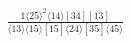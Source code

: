 \documentclass[varwidth, border=5pt]{standalone}
\begin{document}
\begin{my}
$\begin{gathered}
\scriptscriptstyle\frac{1⟨25⟩^2⟨14⟩[34][13]}{⟨13⟩⟨15⟩[15]⟨24⟩[35]⟨45⟩}
\end{gathered}$
\end{my}
\end{document}
